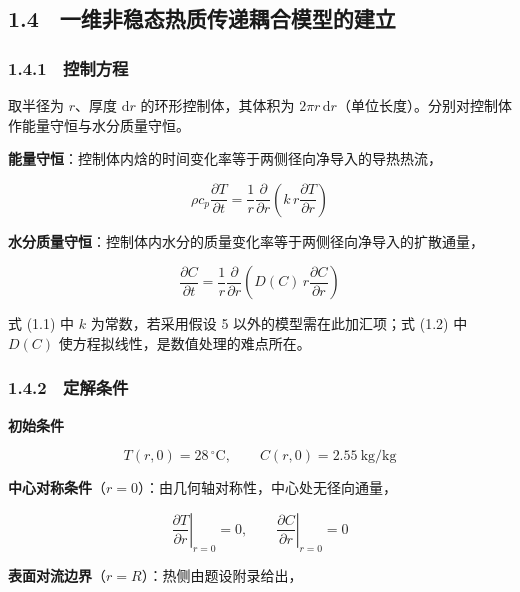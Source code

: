 \documentclass[12pt,a4paper]{ctexart}
\begin{document}
\subsection*{1.4　一维非稳态热质传递耦合模型的建立}

\subsubsection*{1.4.1　控制方程}

取半径为 $r$、厚度 $\mathrm{d}r$ 的环形控制体，其体积为 $2\pi r\,\mathrm{d}r$（单位长度）。分别对控制体作能量守恒与水分质量守恒。

\textbf{能量守恒}：控制体内焓的时间变化率等于两侧径向净导入的导热热流，

\begin{equation}
\rho c_p\frac{\partial T}{\partial t}=\frac{1}{r}\frac{\partial}{\partial r}\!\left(k\,r\frac{\partial T}{\partial r}\right)
\tag{1.1}
\end{equation}

\textbf{水分质量守恒}：控制体内水分的质量变化率等于两侧径向净导入的扩散通量，

\begin{equation}
\frac{\partial C}{\partial t}=\frac{1}{r}\frac{\partial}{\partial r}\!\left(D(C)\,r\frac{\partial C}{\partial r}\right)
\tag{1.2}
\end{equation}

式 (1.1) 中 $k$ 为常数，若采用假设 5 以外的模型需在此加汇项；式 (1.2) 中 $D(C)$ 使方程拟线性，是数值处理的难点所在。

\subsubsection*{1.4.2　定解条件}

\textbf{初始条件}

\begin{equation}
T(r,0)=28\,^\circ\mathrm{C},\qquad C(r,0)=2.55\ \mathrm{kg/kg}
\tag{1.3}
\end{equation}

\textbf{中心对称条件}（$r=0$）：由几何轴对称性，中心处无径向通量，

\begin{equation}
\left.\frac{\partial T}{\partial r}\right|_{r=0}=0,\qquad
\left.\frac{\partial C}{\partial r}\right|_{r=0}=0
\tag{1.4}
\end{equation}

\textbf{表面对流边界}（$r=R$）：热侧由题设附录给出，
\end{document}
